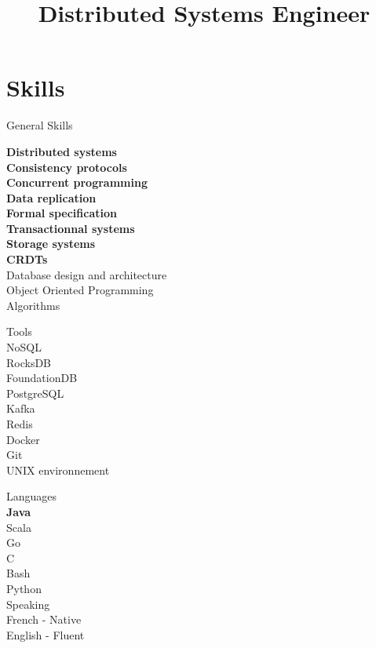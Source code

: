 \documentclass[10pt,a4paper,sans]{moderncv}        %
\title{Distributed Systems Engineer}
\begin{document}
\makecvtitle

\vspace{-1cm}

\section{Skills}
\closesection{}


\begin{multicols}{3}
    {\large \color{color1} General Skills}

    \textbf{Distributed systems}\\
    \textbf{Consistency protocols}\\
    \textbf{Concurrent programming}\\
    \textbf{Data replication}\\
    \textbf{Formal specification}\\
    \textbf{Transactionnal systems}\\
    \textbf{Storage systems}\\
    \textbf{CRDTs}\\
    Database design and architecture\\
    Object Oriented Programming\\
    Algorithms\\


\vfill\null\columnbreak


{\large \color{color1}  Tools} \\
    NoSQL\\
    RocksDB\\
    FoundationDB\\
    PostgreSQL\\
    Kafka\\
    Redis\\
    Docker\\ 
    Git\\ 
    UNIX environnement\\ 

\vfill\null\columnbreak

{\large \color{color1}  Languages}\\
\textbf{Java}\\ 
Scala\\
Go\\
C\\
Bash\\
Python\\


{\large \color{color1} Speaking}\\
    French - Native\\
    English - Fluent\\

\vfill\null\columnbreak

\end{multicols}
\end{document}
